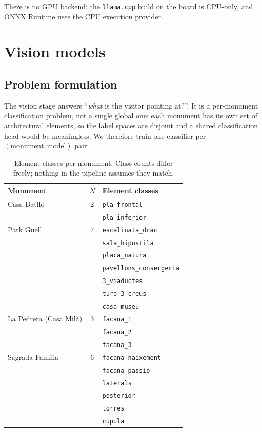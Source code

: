 \documentclass[11pt,a4paper]{article}
\begin{document}
There is no GPU backend: the \texttt{llama.cpp} build on the board is CPU-only,
and ONNX Runtime uses the CPU execution provider.
\section{Vision models}

\subsection{Problem formulation}

The vision stage answers ``\emph{what} is the visitor pointing at?''. It is a
per-monument classification problem, not a single global one: each monument has
its own set of architectural elements, so the label spaces are disjoint and a
shared classification head would be meaningless. We therefore train one
classifier per $(\text{monument}, \text{model})$ pair.

\begin{table}[h]
\centering
\caption{Element classes per monument. Class counts differ freely; nothing in
the pipeline assumes they match.}
\label{tab:vision-classes}
\small
\begin{tabular}{lcl}
\toprule
\textbf{Monument} & \textbf{$N$} & \textbf{Element classes} \\
\midrule
Casa Batll\'o & 2 & \texttt{pla\_frontal} \\
              &   & \texttt{pla\_inferior} \\
\addlinespace
Park G\"uell & 7 & \texttt{escalinata\_drac} \\
             &   & \texttt{sala\_hipostila} \\
             &   & \texttt{placa\_natura} \\
             &   & \texttt{pavellons\_consergeria} \\
             &   & \texttt{3\_viaductes} \\
             &   & \texttt{turo\_3\_creus} \\
             &   & \texttt{casa\_museu} \\
\addlinespace
La Pedrera (Casa Mil\`a) & 3 & \texttt{facana\_1} \\
                         &   & \texttt{facana\_2} \\
                         &   & \texttt{facana\_3} \\
\addlinespace
Sagrada Fam\'ilia & 6 & \texttt{facana\_naixement} \\
                  &   & \texttt{facana\_passio} \\
                  &   & \texttt{laterals} \\
                  &   & \texttt{posterior} \\
                  &   & \texttt{torres} \\
                  &   & \texttt{cupula} \\
\bottomrule
\end{tabular}
\end{table}
\end{document}
